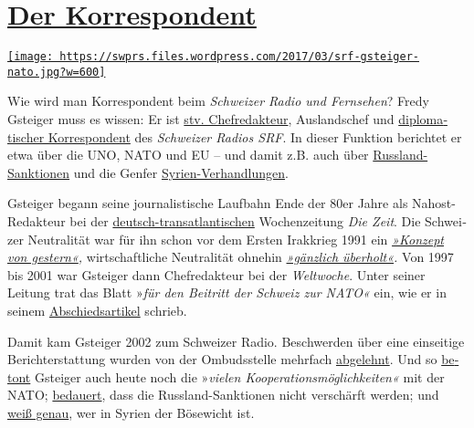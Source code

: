 \hypertarget{der-korrespondent}{%
\section{\texorpdfstring{\href{https://swprs.org/2017/03/01/der-korrespondent/}{Der
Korrespondent}}{Der Korrespondent}}\label{der-korrespondent}}

\href{https://swprs.org/2017/03/01/der-korrespondent/}{\texttt{[image: https://swprs.files.wordpress.com/2017/03/srf-gsteiger-nato.jpg?w=600]}}

Wie wird man Kor­res­pon­dent beim \emph{Schwei­zer Radio und
Fern­sehen}? Fredy Gsteiger muss es wissen: Er ist
\href{http://www.persoenlich.com/medien/fredy-gsteiger-neu-in-der-radio-chefredaktion-232921}{stv.
Chef­redakteur}, Auslands­chef und
\href{http://www.srf.ch/radio-srf-1/radio-srf-1/fredy-gsteiger-unser-mann-in-der-uno}{diplo­ma­tischer
Korres­pon­dent} des \emph{Schwei­zer Radios SRF}. In dieser Funktion
be­richtet er etwa über die UNO, NATO und EU -- und damit z.B. auch über
\href{http://www.srf.ch/news/international/dieser-eu-rueckzieher-ist-peinlich}{Russ­land-Sanktionen}
und die Genfer
\href{http://www.srf.ch/news/international/assad-kommt-mit-giftgaseinsaetzen-vorlaeufig-davon}{Syrien-Ver­hand­lungen}.

Gsteiger begann seine journa­lis­tische Lauf­bahn Ende der 80er Jahre
als Nahost-Redakteur bei der
\href{https://swprs.org/netzwerk-medien-deutschland/}{deutsch-trans­atlan­tischen}
Wochen­zeitung \emph{Die Zeit}. Die Schwei­zer Neutra­lität war für ihn
schon vor dem Ersten Irak­krieg 1991 ein
\emph{\href{http://www.zeit.de/1990/44/ein-konzept-von-gestern}{»Konzept
von gestern«},} wirt­schaft­liche Neutralität ohnehin
\emph{\href{http://www.zeit.de/1990/44/ein-konzept-von-gestern}{»gänz­lich
über­holt«}.} Von 1997 bis 2001 war Gsteiger dann Chef­redakteur bei der
\emph{Welt­woche}. Unter seiner Leitung trat das Blatt »\emph{für den
Bei­tritt der Schweiz zur NATO«} ein, wie er in seinem
\href{https://web.archive.org/web/20040722094101/http://www.weltwoche.ch/artikel/?AssetID=400\&CategoryID=60}{Abschieds­artikel}
schrieb.

Damit kam Gsteiger 2002 zum Schweizer Radio. Be­schwer­den über eine
ein­sei­tige Be­richt­er­stattung wurden von der Ombuds­stelle mehr­fach
\href{https://www.srgd.ch/de/aktuelles/news/2016/09/28/sendung-info-3-auf-radio-srf-3-uber-waffenruhe-syrien-beanstandet/}{abge­lehnt}.
Und so
\href{http://www.swissinfo.ch/ger/kooperation_die-nato-umwirbt-die-schweiz/42225918}{be­tont}
Gsteiger auch heute noch die »\emph{vielen
Koope­ra­tions­möglich­keiten«} mit der NATO;
\href{http://www.srf.ch/news/international/dieser-eu-rueckzieher-ist-peinlich}{be­dauert},
dass die Russ­land-Sanktionen nicht ver­schärft werden; und
\href{http://www.srf.ch/news/international/assad-kommt-mit-giftgaseinsaetzen-vorlaeufig-davon}{weiß
genau}, wer in Syrien der Böse­wicht ist.

